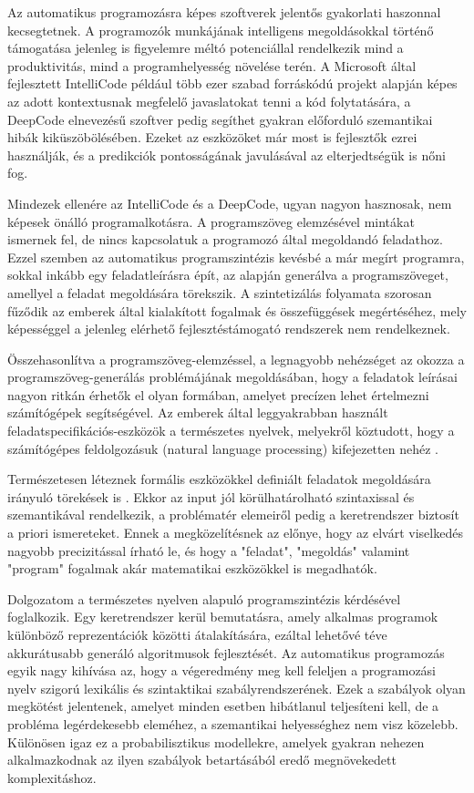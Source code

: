 \documentclass[twoside, 12pt]{report}
\begin{document}
Az automatikus programozásra képes szoftverek jelentős gyakorlati haszonnal kecsegtetnek. A programozók munkájának intelligens megoldásokkal történő támogatása jelenleg is figyelemre méltó potenciállal rendelkezik mind a produktivitás, mind a programhelyesség növelése terén. A Microsoft által fejlesztett IntelliCode \parencite{Mic18a} például több ezer szabad forráskódú projekt alapján képes az adott kontextusnak megfelelő javaslatokat tenni a kód folytatására, a DeepCode \parencite{Dee16a} elnevezésű szoftver pedig segíthet gyakran előforduló szemantikai hibák kiküszöbölésében. Ezeket az eszközöket már most is fejlesztők ezrei használják, és a predikciók pontosságának javulásával az elterjedtségük is nőni fog.

Mindezek ellenére az IntelliCode és a DeepCode, ugyan nagyon hasznosak, nem képesek önálló programalkotásra. A programszöveg elemzésével mintákat ismernek fel, de nincs kapcsolatuk a programozó által megoldandó feladathoz. Ezzel szemben az automatikus programszintézis kevésbé a már megírt programra, sokkal inkább egy feladatleírásra épít, az alapján generálva a programszöveget, amellyel a feladat megoldására törekszik. A szintetizálás folyamata szorosan fűződik az emberek által kialakított fogalmak és összefüggések megértéséhez, mely képességgel a jelenleg elérhető fejlesztéstámogató rendszerek nem rendelkeznek.

Összehasonlítva a programszöveg-elemzéssel, a legnagyobb nehézséget az okozza a programszöveg-generálás problémájának megoldásában, hogy a feladatok leírásai nagyon ritkán érhetők el olyan formában, amelyet precízen lehet értelmezni számítógépek segítségével. Az emberek által leggyakrabban használt feladatspecifikációs-eszközök a természetes nyelvek, melyekről köztudott, hogy a számítógépes feldolgozásuk (natural language processing) kifejezetten nehéz \parencite{Pra10a}.

Természetesen léteznek formális eszközökkel definiált feladatok megoldására irányuló törekések is \parencite{GCM20a}. Ekkor az input jól körülhatárolható szintaxissal és szemantikával rendelkezik, a problématér elemeiről pedig a keretrendszer biztosít a priori ismereteket. Ennek a megközelítésnek az előnye, hogy az elvárt viselkedés nagyobb precizitással írható le, és hogy a "feladat", "megoldás" valamint "program" fogalmak akár matematikai eszközökkel is megadhatók.

Dolgozatom a természetes nyelven alapuló programszintézis kérdésével foglalkozik. Egy keretrendszer kerül bemutatásra, amely alkalmas programok különböző reprezentációk közötti átalakítására, ezáltal lehetővé téve akkurátusabb generáló algoritmusok fejlesztését. Az automatikus programozás egyik nagy kihívása az, hogy a végeredmény meg kell feleljen a programozási nyelv szigorú lexikális és szintaktikai szabályrendszerének. Ezek a szabályok olyan megkötést jelentenek, amelyet minden esetben hibátlanul teljesíteni kell, de a probléma legérdekesebb eleméhez, a szemantikai helyességhez nem visz közelebb. Különösen igaz ez a probabilisztikus modellekre, amelyek gyakran nehezen alkalmazkodnak az ilyen szabályok betartásából eredő megnövekedett komplexitáshoz.
\end{document}
